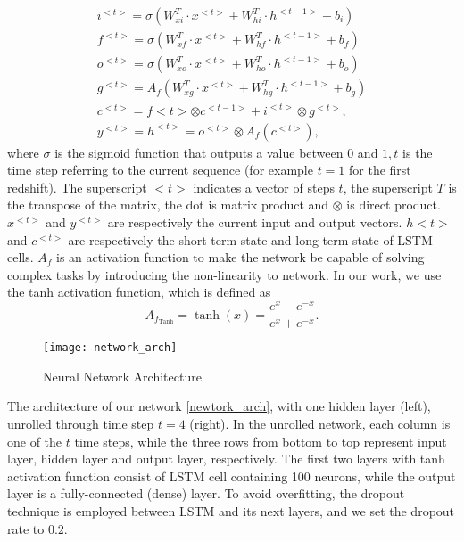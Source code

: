 \begin{align}
i^{<t>}=\sigma\left(W_{x i}^{T} \cdot x^{<t>}+W_{h i}^{T} \cdot h^{<t-1>}+b_{i}\right) \\
f^{<t>}=\sigma\left(W_{x f}^{T} \cdot x^{<t>}+W_{h f}^{T} \cdot h^{<t-1>}+b_{f}\right) \\
o^{<t>}=\sigma\left(W_{x o}^{T} \cdot x^{<t>}+W_{h o}^{T} \cdot h^{<t-1>}+b_{o}\right) \\
g^{<t>}=A_{f}\left(W_{x g}^{T} \cdot x^{<t>}+W_{h g}^{T} \cdot h^{<t-1>}+b_{g}\right) \\
c^{<t>}=f<t>\otimes c^{<t-1>}+i^{<t>} \otimes g^{<t>}, \\
y^{<t>}=h^{<t>}=o^{<t>} \otimes A_{f}\left(c^{<t>}\right),
\end{align}
where $\sigma$ is the sigmoid function that outputs a value between 0 and $1, t$ is the time step referring to the current sequence (for example $t=1$ for the first redshift). The superscript $<t>$ indicates a vector of steps $t$, the superscript $T$ is the transpose of the matrix, the dot is matrix product and $\otimes$ is direct product. $x^{<t>}$ and $y^{<t>}$ are respectively the current input and output vectors. $h<t>$ and $c^{<t>}$ are respectively the short-term state and long-term state of LSTM cells. $A_{f}$ is an activation function to make the network be capable of solving complex tasks by introducing the non-linearity to network. In our work, we use the tanh activation function, which is defined as
$$
A_{f_{\operatorname{Tanh}}}=\tanh (x)=\frac{e^{x}-e^{-x}}{e^{x}+e^{-x}} .
$$
\begin{figure} [H]
	\centering
	\texttt{[image: network\_arch]}
	\caption{Neural Network Architecture}
	\label{newtork_arch}
\end{figure}

The architecture of our network \eqref{newtork_arch}, with one hidden layer (left), unrolled through time step $t=4$ (right). In the unrolled network, each column is one of the $t$ time steps, while the three rows from bottom to top represent input layer, hidden layer and output layer, respectively. The first two layers with tanh activation function consist of LSTM cell containing 100 neurons, while the output layer is a fully-connected (dense) layer. To avoid overfitting, the dropout technique is employed between LSTM and its next layers, and we set the dropout rate to $0.2$.



